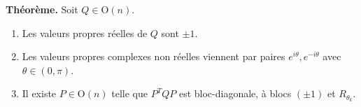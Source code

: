\decsep{}


\begin{tcolorbox}[thmbox]
  \textbf{Théorème.}\enspace%
  Soit $Q \in \mathrm{O}(n)$.
  \begin{enumerate}
    \item Les valeurs propres réelles de $Q$ sont $\pm 1$.
    \item Les valeurs propres complexes non réelles viennent par paires
          $e^{i\theta}, e^{-i\theta}$ avec $\theta \in (0,\pi)$.
    \item Il existe $P \in \mathrm{O}(n)$ telle que $P^TQP$ est bloc-diagonale,
          à blocs $(\pm 1)$ et $R_{\theta_k}$.
  \end{enumerate}
\end{tcolorbox}

